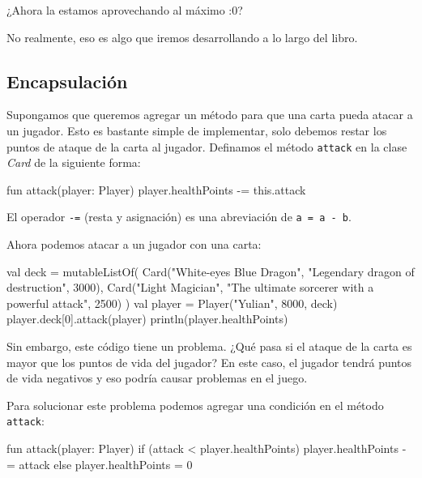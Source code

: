     \begin{center}
      ¿Ahora la estamos aprovechando al máximo :0?
    \end{center}

    No realmente, eso es algo que iremos desarrollando a lo largo del libro.

  \subsection{Encapsulación}
    Supongamos que queremos agregar un método para que una carta pueda atacar a un jugador.
    Esto es bastante simple de implementar, solo debemos restar los puntos de ataque de la carta
    al jugador.
    Definamos el método \texttt{attack} en la clase \textit{Card} de la siguiente forma:

    \begin{kotlin}
      fun attack(player: Player) {
        player.healthPoints -= this.attack
      }
    \end{kotlin}

    \begin{note}
      El operador \texttt{-=} (resta y asignación) es una abreviación de \texttt{a = a - b}.
    \end{note}

    Ahora podemos atacar a un jugador con una carta:

    \begin{kotlin}
      val deck = mutableListOf(
        Card("White-eyes Blue Dragon", "Legendary dragon of destruction", 3000),
        Card("Light Magician", "The ultimate sorcerer with a powerful attack", 2500)
      )
      val player = Player("Yulian", 8000, deck)
      player.deck[0].attack(player)
      println(player.healthPoints)
    \end{kotlin}

    Sin embargo, este código tiene un problema.
    ¿Qué pasa si el ataque de la carta es mayor que los puntos de vida del jugador?
    En este caso, el jugador tendrá puntos de vida negativos y eso podría causar problemas en el
    juego.

    Para solucionar este problema podemos agregar una condición en el método \texttt{attack}:

    \begin{kotlin}
      fun attack(player: Player) {
        if (attack < player.healthPoints) {
          player.healthPoints -= attack
        } else {
          player.healthPoints = 0
        }
      }
    \end{kotlin}


